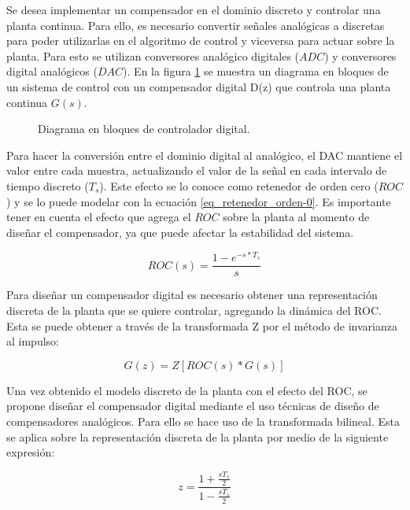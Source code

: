 Se desea implementar un compensador en el dominio discreto y controlar una planta continua. Para ello, es necesario convertir señales analógicas a discretas para poder utilizarlas en el algoritmo de control y viceversa para actuar sobre la planta. Para esto se utilizan conversores analógico digitales ($ADC$) y conversores digital analógicos ($DAC$). En la figura \ref{fig:diag-general-digital} se muestra un diagrama en bloques de un sistema de control con un compensador digital D(z) que controla una planta continua $G(s)$.

\begin{figure}[H]
	\centering
	
	\caption{Diagrama en bloques de controlador digital.}	\label{fig:diag-general-digital}
\end{figure}


Para hacer la conversión entre el dominio digital al analógico, el DAC mantiene el valor entre cada muestra, actualizando el valor de la señal en cada intervalo de tiempo discreto ($T_s$). Este efecto se lo conoce como retenedor de orden cero ($ROC$) y se lo puede modelar con la ecuación \ref{eq_retenedor_orden-0}. Es importante tener en cuenta el efecto que agrega el $ROC$ sobre la planta al momento de diseñar el compensador, ya que puede afectar la estabilidad del sistema.

\begin{equation}\label{eq_retenedor_orden-0}
	ROC(s)=\frac{1-e^{-s*T_s}}{s}
\end{equation}

Para diseñar un compensador digital es necesario obtener una representación discreta de la planta que se quiere controlar, agregando la dinámica del ROC. Esta se puede obtener a través de la transformada Z por el método de invarianza al impulso:

\begin{equation*}
	G(z)= Z[ROC(s)*G(s)]
\end{equation*}

Una vez obtenido el modelo discreto de la planta con el efecto del ROC, se propone diseñar el compensador digital mediante el uso técnicas de diseño de compensadores analógicos. Para ello se hace uso de la transformada bilineal. Esta se aplica sobre la representación discreta de la planta por medio de la siguiente expresión:


\begin{equation*}
	z=\frac{1+\frac{sT_s}{2}}{1-\frac{sT_s}{2}}
\end{equation*}


